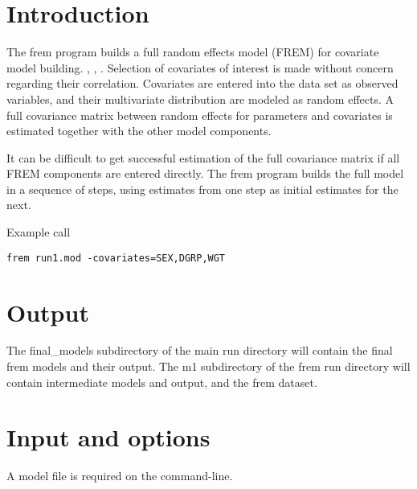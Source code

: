 
\usepackage{amsmath}


\newcommand{\guidetoolname}{frem}

\maketitle

\section{Introduction}
The frem program builds a full random effects model (FREM) for covariate model building.
 \cite{Karlsson}, \cite{Ivaturi}, \cite{Yun}.
Selection of covariates of interest is made without concern regarding their correlation.
Covariates are entered into the data set as observed variables, and their multivariate distribution are modeled
as random effects. A full covariance matrix between random effects for parameters and covariates is estimated
together with the other model components.

It can be difficult to get successful estimation of the full covariance matrix if all FREM components are entered directly.
The frem program builds the full model in a sequence of steps, using estimates from one step as initial estimates for the next.

Example call
\begin{verbatim}
frem run1.mod -covariates=SEX,DGRP,WGT
\end{verbatim}

\section{Output}
The final\_models subdirectory of the main run directory will contain the final frem models and their output.
The m1 subdirectory of the frem run directory will contain intermediate models and output, and the frem dataset.

\section{Input and options}
A model file is required on the command-line.

